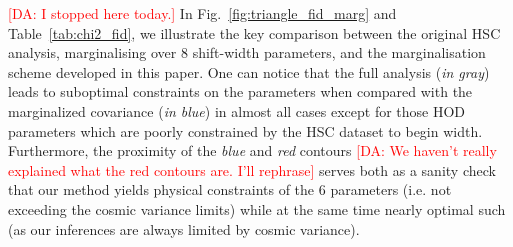 \documentclass[a4paper,11pt]{article}
\newcommand{\da}[1]{{\textcolor{red}{[DA: #1]}}}
\begin{document}
      \da{I stopped here today.}
      In Fig.~\ref{fig:triangle_fid_marg} and Table~\ref{tab:chi2_fid}, we illustrate the key  comparison between the original HSC analysis, marginalising over 8 shift-width parameters, and the marginalisation scheme developed in this paper. One can notice that the full analysis (\textit{in gray}) leads to suboptimal constraints on the parameters when compared with the marginalized covariance (\textit{in blue}) in almost all cases except for those HOD parameters which are poorly constrained by the HSC dataset to begin width. Furthermore, the proximity of the \textit{blue} and \textit{red} contours \da{We haven't really explained what the red contours are. I'll rephrase} serves both as a sanity check that our method yields physical constraints of the 6 parameters (i.e. not exceeding the cosmic variance limits) while at the same time nearly optimal such (as our inferences are always limited by cosmic variance).
\end{document}
